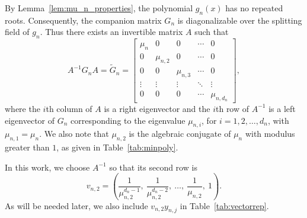 By Lemma~\ref{lem:mu_n_properties}, the polynomial $g_n(x)$ has no repeated roots. Consequently, the companion matrix $G_n$ is diagonalizable over the splitting field of $g_n$. Thus there exists an invertible matrix $A$ such that
\begin{equation}
\label{eq:Gtilde}
A^{-1} G_n A = \widetilde{G}_n =
\begin{bmatrix}
\mu_n & 0 & 0 & \cdots & 0 \\
0 & \mu_{n,2} & 0 & \cdots & 0 \\
0 & 0 & \mu_{n,3} & \cdots & 0 \\
\vdots & \vdots & \vdots & \ddots & \vdots \\
0 & 0 & 0 & \cdots & \mu_{n,d_n}
\end{bmatrix},
\end{equation}
where the $i$th column of $A$ is a right eigenvector and the $i$th row of $A^{-1}$ is a left eigenvector of $G_n$ corresponding to the eigenvalue $\mu_{n,i}$, for $i = 1, 2, \ldots, d_n$, with $\mu_{n,1} = \mu_n$. We also note that $\mu_{n,2}$ is the algebraic conjugate of $\mu_n$ with modulus greater than $1$, as given in Table~\ref{tab:minpoly}.

In this work, we choose $A^{-1}$ so that its second row is
\[
v_{n,2} =
\left( \frac{1}{\mu_{n,2}^{d_n - 1}},\ \frac{1}{\mu_{n,2}^{d_n - 2}},\ \ldots,\ \frac{1}{\mu_{n,2}},\ 1 \right).
\]
As will be needed later, we also include \( v_{n,2} y_{n,j} \) in Table~\ref{tab:vectorrep}.
\newpage

